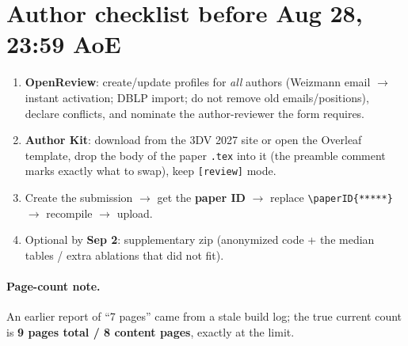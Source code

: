 \documentclass[11pt]{article}
\begin{document}
\section*{Author checklist before Aug 28, 23:59 AoE}
\begin{enumerate}[leftmargin=1.4em,itemsep=2pt]
\item \textbf{OpenReview}: create/update profiles for \emph{all} authors (Weizmann email $\rightarrow$ instant activation; DBLP import; do not remove old emails/positions), declare conflicts, and nominate the author-reviewer the form requires.
\item \textbf{Author Kit}: download from the 3DV 2027 site or open the Overleaf template, drop the body of the paper \texttt{.tex} into it (the preamble comment marks exactly what to swap), keep \texttt{[review]} mode.
\item Create the submission $\rightarrow$ get the \textbf{paper ID} $\rightarrow$ replace \verb|\paperID{*****}| $\rightarrow$ recompile $\rightarrow$ upload.
\item Optional by \textbf{Sep 2}: supplementary zip (anonymized code + the median tables / extra ablations that did not fit).
\end{enumerate}

\paragraph{Page-count note.} An earlier report of ``7 pages'' came from a stale build log; the true current count is \textbf{9 pages total / 8 content pages}, exactly at the limit.
\end{document}
